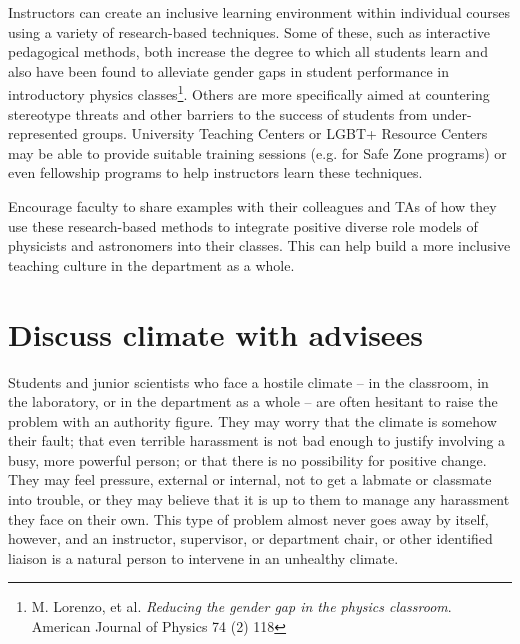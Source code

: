 Instructors can create an inclusive learning environment within individual courses using a variety of research-based techniques. Some of these, such as interactive pedagogical methods, both increase the degree to which all students learn and also have been found to alleviate gender gaps in student performance in introductory physics classes\footnote{M. Lorenzo, et al. \emph{Reducing the gender gap in the physics classroom}. American Journal of Physics 74 (2) 118}. Others are more specifically aimed at countering stereotype threats and other barriers to the success of students from under-represented groups. University Teaching Centers or LGBT+ Resource Centers may be able to provide suitable training sessions (e.g. for Safe Zone programs) or even fellowship programs to help instructors learn these techniques. 

Encourage faculty to share examples with their colleagues and TAs of how they use these research-based methods to integrate positive diverse role models of physicists and astronomers into their classes. This can help build a more inclusive teaching culture in the department as a whole.


\section {Discuss climate with advisees}
\label{talk-advisees}
Students and junior scientists who face a hostile climate -- in the classroom, in the laboratory, or in the department as a whole -- are often hesitant to raise the problem with an authority figure. They may worry that the climate is somehow their fault; that even terrible harassment is not bad enough to justify involving a busy, more powerful person; or that there is no possibility for positive change. They may feel pressure, external or internal, not to get a labmate or classmate into trouble, or they may believe that it is up to them to manage any harassment they face on their own. This type of problem almost never goes away by itself, however, and an instructor, supervisor, or department chair, or other identified liaison is a natural person to intervene in an unhealthy climate.

